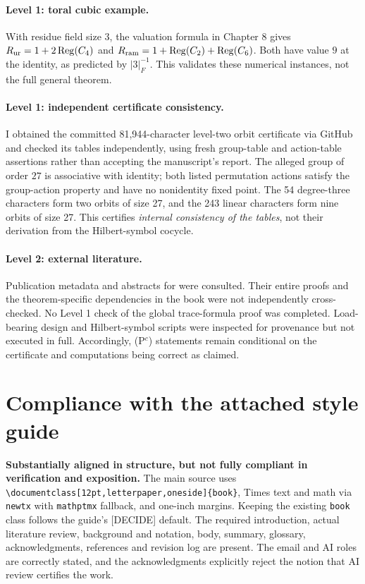 \documentclass[12pt,letterpaper]{article}
\begin{document}
\paragraph{Level 1: toral cubic example.} With residue field size $3$,
the valuation formula in Chapter 8 gives
$R_{\rm ur}=1+2\operatorname{Reg}(C_4)$ and
$R_{\rm ram}=1+\operatorname{Reg}(C_2)+\operatorname{Reg}(C_6)$.
Both have value $9$ at the identity, as predicted by $|3|_F^{-1}$.
This validates these numerical instances, not the full general theorem.

\paragraph{Level 1: independent certificate consistency.} I obtained
the committed 81,944-character level-two orbit certificate via GitHub
and checked its tables independently, using fresh group-table and
action-table assertions rather than accepting the manuscript's report.
The alleged group of order $27$ is associative with identity; both
listed permutation actions satisfy the group-action property and have
no nonidentity fixed point. The 54 degree-three characters form two
orbits of size 27, and the 243 linear characters form nine orbits of
size 27. This certifies \emph{internal consistency of the tables},
not their derivation from the Hilbert-symbol cocycle.

\paragraph{Level 2: external literature.} Publication metadata and
abstracts for \cite{FK86,Jo88,Zo23,KLZ23} were consulted. Their entire
proofs and the theorem-specific dependencies in the book were not
independently cross-checked. No Level 1 check of the global trace-formula
proof was completed. Load-bearing design and Hilbert-symbol scripts
were inspected for provenance but not executed in full. Accordingly,
(P$^c$) statements remain conditional on the certificate and computations
being correct as claimed.

\section{Compliance with the attached style guide}
\textbf{Substantially aligned in structure, but not fully compliant in
verification and exposition.} The main source uses
\verb|\documentclass[12pt,letterpaper,oneside]{book}|, Times text and
math via \texttt{newtx} with \texttt{mathptmx} fallback, and one-inch
margins. Keeping the existing \texttt{book} class follows the guide's
[DECIDE] default. The required introduction, actual literature review,
background and notation, body, summary, glossary, acknowledgments,
references and revision log are present. The email and AI roles are
correctly stated, and the acknowledgments explicitly reject the notion
that AI review certifies the work.
\end{document}
